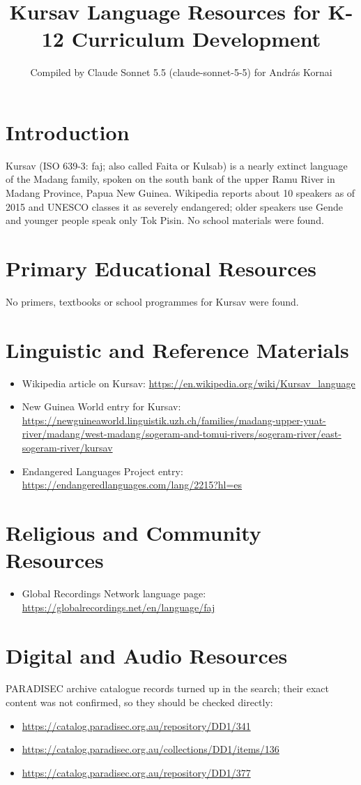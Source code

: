 \documentclass[12pt]{article}
\title{Kursav Language Resources for K-12 Curriculum Development}
\author{Compiled by Claude Sonnet 5.5 (claude-sonnet-5-5) for Andr\'as Kornai}
\date{}
\begin{document}
\maketitle

\section{Introduction}
Kursav (ISO 639-3: faj; also called Faita or Kulsab) is a nearly extinct language of the Madang family, spoken on the south bank of the upper Ramu River in Madang Province, Papua New Guinea. Wikipedia reports about 10 speakers as of 2015 and UNESCO classes it as severely endangered; older speakers use Gende and younger people speak only Tok Pisin. No school materials were found.

\section{Primary Educational Resources}
No primers, textbooks or school programmes for Kursav were found.

\section{Linguistic and Reference Materials}
\begin{itemize}
\item Wikipedia article on Kursav: \url{https://en.wikipedia.org/wiki/Kursav_language}
\item New Guinea World entry for Kursav: \url{https://newguineaworld.linguistik.uzh.ch/families/madang-upper-yuat-river/madang/west-madang/sogeram-and-tomui-rivers/sogeram-river/east-sogeram-river/kursav}
\item Endangered Languages Project entry: \url{https://endangeredlanguages.com/lang/2215?hl=es}
\end{itemize}

\section{Religious and Community Resources}
\begin{itemize}
\item Global Recordings Network language page: \url{https://globalrecordings.net/en/language/faj}
\end{itemize}

\section{Digital and Audio Resources}
PARADISEC archive catalogue records turned up in the search; their exact content was not confirmed, so they should be checked directly:
\begin{itemize}
\item \url{https://catalog.paradisec.org.au/repository/DD1/341}
\item \url{https://catalog.paradisec.org.au/collections/DD1/items/136}
\item \url{https://catalog.paradisec.org.au/repository/DD1/377}
\end{itemize}
\end{document}
